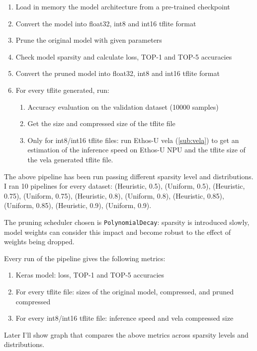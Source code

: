 \begin{enumerate}
    \item Load in memory the model architecture from a pre-trained checkpoint
    \item Convert the model into float32, int8 and int16 tflite format
    \item Prune the original model with given parameters
    \item Check model sparsity and calculate loss, TOP-1 and TOP-5 accuracies
    \item Convert the pruned model into float32, int8 and int16 tflite format
    \item For every tflite generated, run:
    \begin{enumerate}
        \item Accuracy evaluation on the validation dataset (10000 samples)
        \item Get the size and compressed size of the tflite file
        \item Only for int8/int16 tflite files: run Ethos-U vela
            (\autoref{sub:vela}) to get an estimation of the inference speed on
            Ethos-U NPU and the tflite size of the vela generated tflite file.
    \end{enumerate}
\end{enumerate}

The above pipeline has been run passing different sparsity level and
distributions. I ran 10 pipelines for every dataset: (Heuristic, 0.5),
(Uniform, 0.5), (Heuristic, 0.75), (Uniform, 0.75), (Heuristic, 0.8),
(Uniform, 0.8), (Heuristic, 0.85), (Uniform, 0.85), (Heuristic, 0.9),
(Uniform, 0.9).

The pruning scheduler chosen is \texttt{PolynomialDecay}: sparsity is
introduced slowly, model weights can consider this impact and become robust to
the effect of weights being dropped.

Every run of the pipeline gives the following metrics:
\begin{enumerate}
    \item Keras model: loss, TOP-1 and TOP-5 accuracies
    \item For every tflite file: sizes of the original model, compressed, and
        pruned compressed
    \item For every int8/int16 tflite file: inference speed and vela compressed
        size
\end{enumerate}

Later I'll show graph that compares the above metrics across sparsity levels
and distributions.

